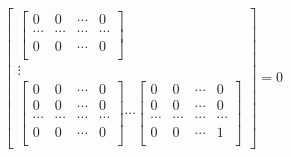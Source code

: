 \documentclass[twoside,a4paper,CCT]{cctart}   %
\begin{document}
\begin{list}{}
$$\begin{bmatrix}
\begin{bmatrix}
  0& 0&\cdots&0\\
  \cdots& \cdots&\cdots&\cdots \\
 0& 0&\cdots&0\\
 \end{bmatrix}\\
\vdots\\
\begin{bmatrix}
  0& 0&\cdots&0\\
  0& 0&\cdots&0\\
  \cdots& \cdots&\cdots&\cdots \\
   0& 0&\cdots&0\\
   \end{bmatrix}
\cdots
\begin{bmatrix}
  0& 0&\cdots&0\\
  0& 0&\cdots&0\\
  \cdots& \cdots&\cdots&\cdots \\
   0& 0&\cdots&1\\
   \end{bmatrix}
    \end{bmatrix}
    =0$$
 \end{list}
\end{document}
